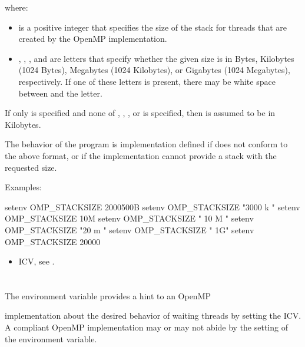 where: 

\begin{itemize}
\item {} is a positive integer that specifies the size of the stack for threads that are created 
by the OpenMP implementation. 

\item {}, , , and  are letters that specify 
whether the given size is in Bytes, Kilobytes 
(1024 Bytes), Megabytes (1024 Kilobytes), or Gigabytes (1024 Megabytes), 
respectively. If one of these letters is present, there may be white space between 
 and the letter.
\end{itemize}

If only  is specified and none of , , , or  
is specified, then  is assumed to be in Kilobytes.

The behavior of the program is implementation defined if  does not 
conform to the above format, or if the implementation cannot provide a stack with the 
requested size.

Examples:
\begin{boxedcode}
setenv OMP\_STACKSIZE 2000500B 
setenv OMP\_STACKSIZE "3000 k " 
setenv OMP\_STACKSIZE 10M 
setenv OMP\_STACKSIZE " 10 M "
setenv OMP\_STACKSIZE "20 m " 
setenv OMP\_STACKSIZE " 1G" 
setenv OMP\_STACKSIZE 20000 
\end{boxedcode}

\crossreferences
\begin{itemize}
\item {} ICV, see .
\end{itemize}









\section{}
\label{sec:OMP_WAIT_POLICY}
The  environment variable provides a hint to an OpenMP 

implementation about the desired behavior of waiting threads by setting the 
 ICV. A compliant OpenMP implementation may or may not abide by the setting of 
the environment variable.

